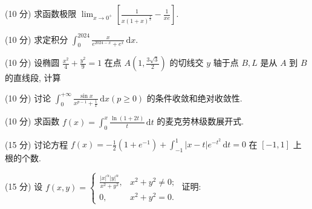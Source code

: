 \par{}
(10 分) 求函数极限 $\lim_{x\to 0^{+}}\left[\frac{1}{x(1 + x)^{\frac{1}{x}}} -\frac{1}{xe}\right]$.\par
\par{}
(10 分) 求定积分 $\int_{0}^{2024} \frac{x}{e^{2024 - x} + e^x} \, \mathrm{d}x$.\par
\par{}
\par{}
(10 分) 设椭圆 $\frac{x^2}{4} + \frac{y^2}{9} = 1$ 在点 $A\left(1, \frac{3\sqrt{3}}{2}\right)$ 的切线交 $y$ 轴于点 $B, L$ 是从 $A$ 到 $B$ 的直线段, 计算\par
\nopagebreak[4]
\par{}
(10 分) 讨论 $\int_0^{+\infty} \frac{\sin x}{x^{p-1} + \frac{1}{x}} \, \mathrm{d}x (p \geq 0)$ 的条件收敛和绝对收敛性.\par
\par{}
(10 分) 求函数 $f(x) = \int_{0}^{x} \frac{\ln(1 + 2t)}{t} \, \mathrm{d}t$ 的麦克劳林级数展开式.\par
\par{}
(15 分) 讨论方程 $f(x) = -\frac{1}{2} (1 + e^{-1}) + \int_{-1}^{1} |x - t| e^{-t^2} \, \mathrm{d}t = 0$ 在 $[-1, 1]$ 上根的个数.\par
\par{}
(15 分) 设 $f(x, y) = \begin{cases} \frac{|x|^{\alpha}|y|^{\alpha}}{x^2 + y^2}, & x^2 + y^2 \neq 0; \\ 0, & x^2 + y^2 = 0. \end{cases}$ 证明:\par
